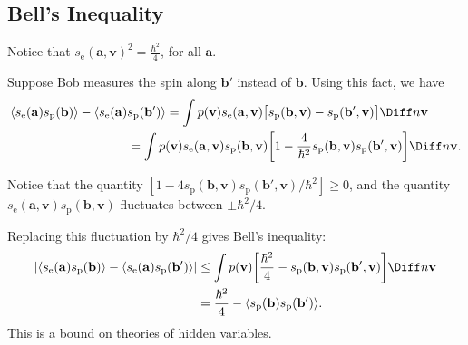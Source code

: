 \documentclass[12pt]{article}
\begin{document}
\subsection{Bell's Inequality}
\label{sub:bell}

Notice that $s_{\mathrm{e}}(\mathbf{a}, \mathbf{v})^2 = \frac{\hbar^2}{4}$, for all $\mathbf{a}$.

Suppose Bob measures the spin along $\mathbf{b}'$ instead of $\mathbf{b}$. Using this fact, we have
\begin{align*}
	\langle s_{\mathrm{e}}(\mathbf{a}) s_{\mathrm{p}}(\mathbf{b}) \rangle - \langle s_{\mathrm{e}}(\mathbf{a}) &s_{\mathrm{p}}(\mathbf{b}') \rangle = \int p(\mathbf{v}) s_{\mathrm{e}}(\mathbf{a}, \mathbf{v}) \bigl[ s_{\mathrm{p}}(\mathbf{b}, \mathbf{v}) - s_{\mathrm{p}}(\mathbf{b}', \mathbf{v}) \bigr] \Diff n \mathbf{v} \\
																		       &= \int p(\mathbf{v}) s_{\mathrm{e}}(\mathbf{a}, \mathbf{v}) s_{\mathrm{p}}(\mathbf{b}, \mathbf{v}) \biggl[ 1 - \frac{4}{\hbar^2} s_{\mathrm{p}}(\mathbf{b}, \mathbf{v}) s_{\mathrm{p}}(\mathbf{b}', \mathbf{v}) \biggr] \Diff n \mathbf{v}.
\end{align*}

Notice that the quantity $[1 - 4 s_{\mathrm{p}}(\mathbf{b}, \mathbf{v}) s_{\mathrm{p}}(\mathbf{b}', \mathbf{v})/\hbar^2] \geq 0$, and the quantity $s_{\mathrm{e}}(\mathbf{a}, \mathbf{v})s_{\mathrm{p}}(\mathbf{b}, \mathbf{v})$ fluctuates between $\pm \hbar^2/4$.

Replacing this fluctuation by $\hbar^2/4$ gives Bell's inequality:
\begin{align*}
	|\langle s_{\mathrm{e}}(\mathbf{a}) s_{\mathrm{p}}(\mathbf{b}) \rangle - \langle s_{\mathrm{e}}(\mathbf{a}) s_{\mathrm{p}}(\mathbf{b}') \rangle| &\leq \int p(\mathbf{v}) \biggl[\frac{\hbar^2}{4} - s_{\mathrm{p}}(\mathbf{b}, \mathbf{v}) s_{\mathrm{p}}(\mathbf{b}', \mathbf{v}) \biggr] \Diff n \mathbf{v} \\
																			 &= \frac{\hbar^2}{4} - \langle s_{\mathrm{p}}(\mathbf{b}) s_{\mathrm{p}}(\mathbf{b}')\rangle.
\end{align*}
This is a bound on theories of hidden variables.
\end{document}
